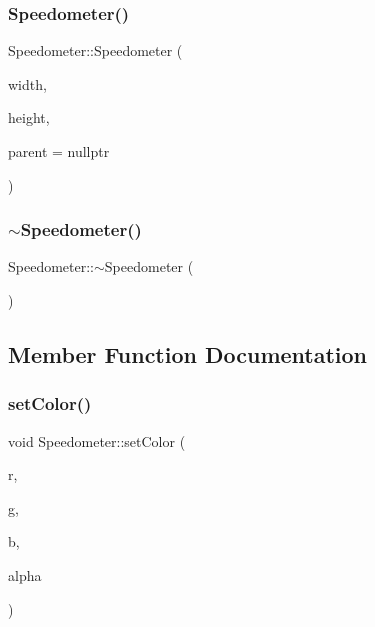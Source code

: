\subsubsection{\texorpdfstring{Speedometer()}{Speedometer()}}
{\footnotesize\ttfamily Speedometer\+::\+Speedometer (\begin{DoxyParamCaption}\item[{int}]{width,  }\item[{int}]{height,  }\item[{Q\+Widget $\ast$}]{parent = {\ttfamily nullptr} }\end{DoxyParamCaption})\hspace{0.3cm}{\ttfamily [explicit]}}

\mbox{\label{class_speedometer_aba22e8543b09ffeec4be5e904e9507f0}} 
\subsubsection{\texorpdfstring{$\sim$Speedometer()}{~Speedometer()}}
{\footnotesize\ttfamily Speedometer\+::$\sim$\+Speedometer (\begin{DoxyParamCaption}{ }\end{DoxyParamCaption})}



\subsection{Member Function Documentation}
\mbox{\label{class_speedometer_a50fc8806fbc8f42b2550004d63df1e95}} 
\subsubsection{\texorpdfstring{setColor()}{setColor()}}
{\footnotesize\ttfamily void Speedometer\+::set\+Color (\begin{DoxyParamCaption}\item[{int}]{r,  }\item[{int}]{g,  }\item[{int}]{b,  }\item[{int}]{alpha }\end{DoxyParamCaption})}


